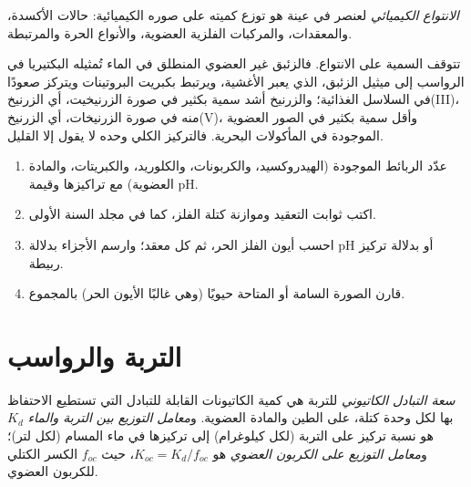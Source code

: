 \begin{definition}[الانتواع]\label{def:b3:environmental-toxicology:speciation}
\emph{الانتواع الكيميائي} لعنصر في
عينة هو توزع كميته على صوره الكيميائية: حالات
الأكسدة، والمعقدات، والمركبات الفلزية العضوية، والأنواع الحرة والمرتبطة.
\end{definition}

تتوقف السمية على الانتواع. فالزئبق غير العضوي المنطلق في الماء
تُمثيله البكتيريا في الرواسب إلى ميثيل الزئبق، الذي يعبر الأغشية،
ويرتبط بكبريت البروتينات ويتركز صعودًا في السلاسل الغذائية؛ والزرنيخ أشد
سمية بكثير في صورة الزرنيخيت، أي الزرنيخ(III)، منه في صورة الزرنيخات، أي الزرنيخ(V)، وأقل سمية بكثير في الصور
العضوية الموجودة في المأكولات البحرية. فالتركيز الكلي وحده لا يقول إلا القليل.

\begin{method}\label{met:b3:environmental-toxicology:speciation}
\begin{enumerate}
  \item عدّد الربائط الموجودة (الهيدروكسيد، والكربونات، والكلوريد، والكبريتات، والمادة
        العضوية) مع تراكيزها وقيمة pH.
  \item اكتب ثوابت التعقيد وموازنة كتلة الفلز، كما في
        مجلد السنة الأولى.
  \item احسب أيون الفلز الحر، ثم كل معقد؛ وارسم الأجزاء بدلالة
        pH أو بدلالة تركيز ربيطة.
  \item قارن الصورة السامة أو المتاحة حيويًا (وهي غالبًا الأيون الحر) بالمجموع.
\end{enumerate}
\end{method}

\section{التربة والرواسب}

\begin{definition}\label{def:b3:environmental-toxicology:soil}
\emph{سعة التبادل الكاتيوني} للتربة هي
كمية الكاتيونات القابلة للتبادل التي تستطيع الاحتفاظ بها لكل وحدة كتلة، على الطين والمادة
العضوية. و\emph{معامل التوزيع بين التربة والماء}
$K_d$ هو نسبة تركيز  على التربة (لكل كيلوغرام) إلى تركيزها في ماء المسام (لكل
لتر)؛ و\emph{معامل التوزيع على الكربون العضوي}
هو $K_{oc} = K_d/f_{oc}$، حيث $f_{oc}$ الكسر الكتلي للكربون العضوي.
\end{definition}

